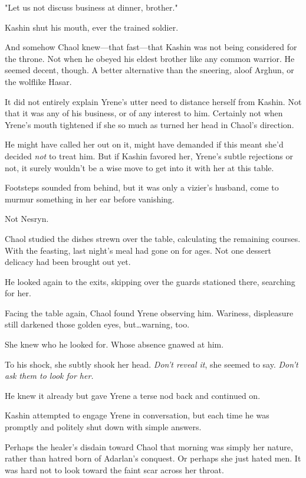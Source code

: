 "Let us not discuss business at dinner, brother."

Kashin shut his mouth, ever the trained soldier.

And somehow Chaol knew---that fast---that Kashin was not being considered for the throne.
Not when he obeyed his eldest brother like any common warrior.
He seemed decent, though.
A better alternative than the sneering, aloof Arghun, or the wolflike Hasar.

It did not entirely explain Yrene's utter need to distance herself from Kashin.
Not that it was any of his business, or of any interest to him.
Certainly not when Yrene's mouth tightened if she so much as turned her head in Chaol's direction.

He might have called her out on it, might have demanded if this meant she'd decided \emph{not} to treat him.
But if Kashin favored her, Yrene's subtle rejections or not, it surely wouldn't be a wise move to get into it with her at this table.

Footsteps sounded from behind, but it was only a vizier's husband, come to murmur something in her ear before vanishing.

Not Nesryn.

Chaol studied the dishes strewn over the table, calculating the remaining courses.
With the feasting, last night's meal had gone on for ages.
Not one dessert delicacy had been brought out yet.

He looked again to the exits, skipping over the guards stationed there, searching for her.

Facing the table again, Chaol found Yrene observing him.
Wariness, displeasure still darkened those golden eyes, but\ldots warning, too.

She knew who he looked for.
Whose absence gnawed at him.

To his shock, she subtly shook her head.
\emph{Don't reveal it}, she seemed to say.
\emph{Don't ask them to look for her.}

He knew it already but gave Yrene a terse nod back and continued on.

Kashin attempted to engage Yrene in conversation, but each time he was promptly and politely shut down with simple answers.

Perhaps the healer's disdain toward Chaol that morning was simply her nature, rather than hatred born of Adarlan's conquest.
Or perhaps she just hated men.
It was hard not to look toward the faint scar across her throat.

